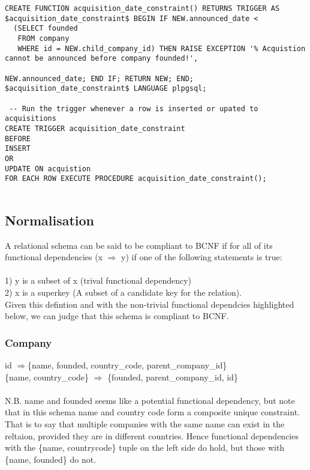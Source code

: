 \documentclass[12pt]{article}
\begin{document}
\begin{verbatim}
CREATE FUNCTION acquisition_date_constraint() RETURNS TRIGGER AS $acquisition_date_constraint$ BEGIN IF NEW.announced_date <
  (SELECT founded
   FROM company
   WHERE id = NEW.child_company_id) THEN RAISE EXCEPTION '% Acquistion cannot be announced before company founded!',
                                                         NEW.announced_date; END IF; RETURN NEW; END; $acquisition_date_constraint$ LANGUAGE plpgsql;

 -- Run the trigger whenever a row is inserted or upated to acquisitions
CREATE TRIGGER acquisition_date_constraint
BEFORE
INSERT
OR
UPDATE ON acquistion
FOR EACH ROW EXECUTE PROCEDURE acquisition_date_constraint();


\end{verbatim}

\subsection{Normalisation}
A relational schema can be said to be compliant to BCNF if for all of its functional dependencies (x $\Rightarrow$ y) if one of the following statements is true: \\\\
1) y is a subset of x (trival functional dependency) \\
2) x is a superkey (A subset of a candidate key for the relation). \\
Given this defintion and with the non-trivial functional dependcies highlighted below, we can judge that this schema is compliant to BCNF.

\subsubsection{Company}

id $\Rightarrow${\{name, founded, country\_code, parent\_company\_id\}} \\
\{{name, country\_code\}} $\Rightarrow$ {\{founded, parent\_company\_id, id\}} \\

\\ N.B. name and founded seems like a potential functional dependency, but note that in this schema name and country code form a composite unique constraint. That is to say that multiple companies with the same name can exist in the reltaion, provided they are in different countries. Hence functional dependencies with the \{{name, countrycode\}} tuple on the left side do hold, but those with \{{name, founded\}} do not.
\end{document}
